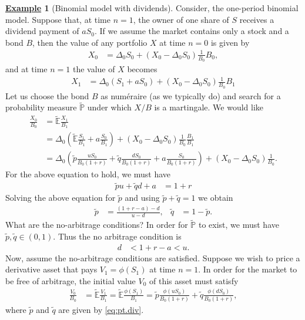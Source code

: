 \documentclass[12pt]{book}
\numberwithin{equation}{chapter}
\theoremstyle{plain}
\numberwithin{theorem}{section}
\theoremstyle{definition}
\newtheorem{example}[theorem]{\underline{Example}}
\numberwithin{exercise}{chapter}
\newcommand{\<}{\langle}
\renewcommand{\>}{\rangle}
\renewcommand{\(}{\left(}
\renewcommand{\)}{\right)}
\renewcommand{\[}{\left[}
\renewcommand{\]}{\right]}
\newcommand\Eb{\mathds{E}}
\newcommand\Pb{\mathds{P}}
\newcommand\Del{\Delta}
\newcommand\Ebt{\widetilde{\Eb}}
\newcommand\Pbt{\widetilde{\Pb}}
\newcommand\qt{\widetilde{q}}
\theoremstyle{definition}
\numberwithin{question}{section}
\newcommand\pt{\widetilde{p}}
\begin{document}
\begin{example}[Binomial model with dividends]
Consider, the one-period binomial model.  Suppose that, at time $n=1$, the owner of one share of $S$ receives a dividend payment of $a S_0$.  If we assume the market contains only a stock and a bond $B$, then the value of any portfolio $X$ at time $n=0$ is given by
\begin{align}
X_0
	&=	\Del_0 S_0 + (X_0 - \Del_0 S_0)\frac{1}{B_0} B_0 ,
\end{align}
and at time $n=1$ the value of $X$ becomes
\begin{align}
X_1
	&=	\Del_0 ( S_1 + a S_0) + (X_0 - \Del_0 S_0)\frac{1}{B_0} B_1
\end{align}
Let us choose the bond $B$ as num\'eraire (as we typically do) and search for a probability measure $\Pbt$ under which $X/B$ is a martingale.  We would like
\begin{align}
\frac{X_0}{B_0}
	&=	\Ebt \frac{X_1}{B_1} \\
	&=	\Del_0 \( \Ebt \frac{S_1}{B_1} + a \frac{S_0}{B_1} \) + (X_0 - \Del_0 S_0)\frac{1}{B_0} \frac{B_1}{B_1} \\
	&=	\Del_0 \( \pt \frac{u S_0}{B_0(1+r)} + \qt \frac{d S_0}{B_0(1+r)} + a \frac{S_0}{B_0(1+r)} \) + (X_0 - \Del_0 S_0)\frac{1}{B_0} .
\end{align}
For the above equation to hold, we must have
\begin{align}
\pt u + \qt d + a
	&=	1+r
\end{align}
Solving the above equation for $\pt$ and using $\pt + \qt = 1$ we obtain
\begin{align}
\pt
	&=	\frac{(1 + r - a) - d}{u-d} , &
\qt
	&=	1 - \pt . \label{eq:pt.div}
\end{align}
What are the no-arbitrage conditions?  In order for $\Pbt$ to exist, we must have $\pt, \qt \in (0,1)$.  Thus the no arbitrage condition is
\begin{align}
d
	& < 1 + r - a < u .
\end{align}
Now, assume the no-arbitrage conditions are satisfied.  Suppose we wish to price a derivative asset that pays $V_1 = \phi(S_1)$ at time $n=1$.  In order for the market to be free of arbitrage, the initial value $V_0$ of this asset must satisfy
\begin{align}
\frac{V_0}{B_0}
	&=	\Ebt \frac{V_1}{B_1}
	=		\Ebt \frac{\phi(S_1)}{B_1}
	=		\pt \frac{\phi(u S_0)}{B_0(1+r)} + \qt \frac{\phi(d S_0)}{B_0(1+r)} ,
\end{align}
where $\pt$ and $\qt$ are given by \eqref{eq:pt.div}.
\end{example}
\end{document}
